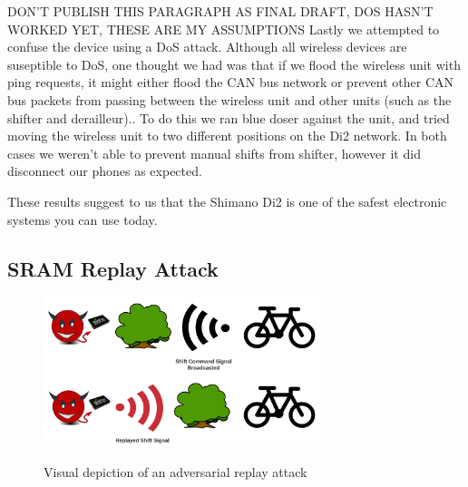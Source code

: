 \documentclass[letterpaper,twocolumn,10pt]{article}
\begin{document}
DON'T PUBLISH THIS PARAGRAPH AS FINAL DRAFT, DOS HASN'T WORKED YET, THESE ARE MY ASSUMPTIONS Lastly we attempted to confuse the device using a DoS attack. Although all wireless devices are suseptible to DoS, one thought we had was that if we flood the wireless unit with ping requests, it might either flood the CAN bus network or prevent other CAN bus packets from passing between the wireless unit and other units (such as the shifter and derailleur).. To do this we ran blue doser against the unit, and tried moving the wireless unit to two different positions on the Di2 network. In both cases we weren't able to prevent manual shifts from shifter, however it did disconnect our phones as expected.

These results suggest to us that the Shimano Di2 is one of the safest electronic systems you can use today.

\subsection{SRAM Replay Attack}

\begin{figure}[ht]
  \begin{center}
    \centering
    \includegraphics[width=230pt]{images/replay.png}
    \label{fig:Replay}
  \end{center}
  \caption{Visual depiction of an adversarial replay attack}
\end{figure}
\end{document}
